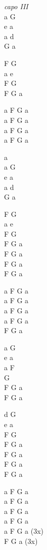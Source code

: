 \begin{chord}
    \begin{tinyTwelve}
    \textit{capo III}\\
    a G\\
    e a\\
    a d\\
    G a

    F G\\
    a e\\
    F G\\
    F G a

    a F G a\\
    a F G a\\
    a F G a\\
    a F G a

    a\\
    a G\\
    e a\\
    a d\\
    G a

    F G\\
    a e\\
    F G\\
    F G a\\
    F G a\\
    F G a\\
    F G a

    a F G a\\
    a F G a\\
    a F G a\\
    a F G a\\
    F G a

    a G\\
    e a\\
    a F\\
    G\\
    F G a\\
    F G a

    d G\\
    e a\\
    F G\\
    F G a\\
    F G a\\
    F G a\\
    F G a

    a F G a\\
    a F G a\\
    a F G a\\
    a F G a\\
    a F G a (3x)\\
    F G a (3x)
\end{tinyTwelve}
\end{chord}
